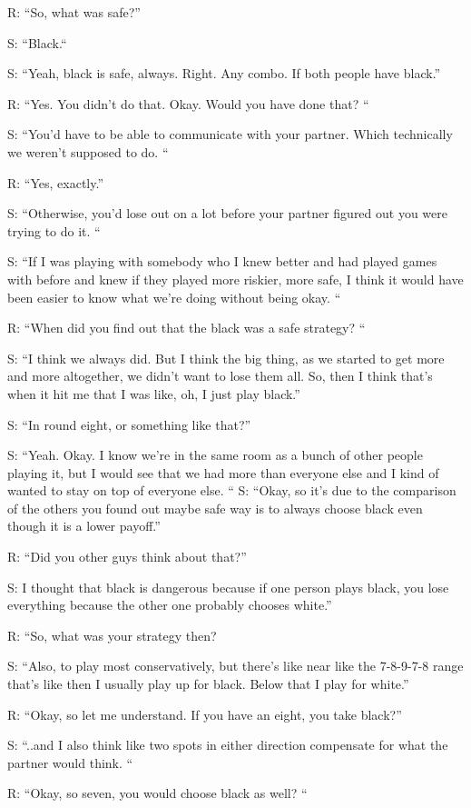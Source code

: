 \documentclass[a4paper,superscriptaddress,nofootinbib]{revtex4}
\begin{document}
R: “So, what was safe?”

S: “Black.“

S: “Yeah, black is safe, always. Right. Any combo. If both people have black.” 

R: “Yes. You didn't do that. Okay. Would you have done that? “

S: “You'd have to be able to communicate with your partner. Which technically we weren't supposed to do. “

R: “Yes, exactly.”

S: “Otherwise, you'd lose out on a lot before your partner figured out you were trying to do it. “

S: “If I was playing with somebody who I knew better and had played games with before and knew if they played more riskier, more safe, I think it would have been easier to know what we're doing without being okay. “

R: “When did you find out that the black was a safe strategy? “

S: “I think we always did. But I think the big thing, as we started to get more and more altogether, we didn't want to lose them all. So, then I think that's when it hit me that I was like, oh, I just play black.”

S: “In round eight, or something like that?”

S: “Yeah. Okay. I know we're in the same room as a bunch of other people playing it, but I would see that we had more than everyone else and I kind of wanted to stay on top of everyone else. “
S: “Okay, so it's due to the comparison of the others you found out maybe safe way is to always choose black even though it is a lower payoff.”

R: “Did you other guys think about that?” 

S: I thought that black is dangerous because if one person plays black, you lose everything because the other one probably chooses white.”

R: “So, what was your strategy then? 

S: “Also, to play most conservatively, but there's like near like the 7-8-9-7-8 range that's like then I usually play up for black. Below that I play for white.” 

R: “Okay, so let me understand. If you have an eight, you take black?”

S: “..and I also think like two spots in either direction compensate for what the partner would think. “

R: “Okay, so seven, you would choose black as well? “
\end{document}
